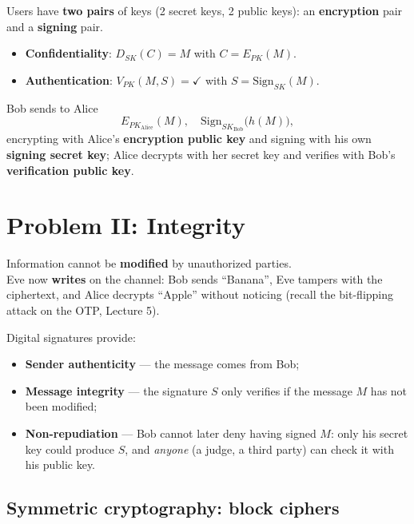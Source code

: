 \begin{defnbox}[title={All together: asymmetric confidentiality and authentication}]
Users have \textbf{two pairs} of keys (2 secret keys, 2 public keys): an
\textbf{encryption} pair and a \textbf{signing} pair.
\begin{itemize}
  \item \textbf{Confidentiality}: $D_{SK}(C) = M$ with $C = E_{PK}(M)$.
  \item \textbf{Authentication}: $V_{PK}(M, S) = \checkmark$ with
        $S = \mathrm{Sign}_{SK}(M)$.
\end{itemize}
Bob sends to Alice
\[
  E_{PK_{\text{Alice}}}(M), \quad \mathrm{Sign}_{SK_{\text{Bob}}}\big(h(M)\big),
\]
encrypting with Alice's \textbf{encryption public key} and signing with his own
\textbf{signing secret key}; Alice decrypts with her secret key and verifies with Bob's
\textbf{verification public key}.
\end{defnbox}

\section{Problem II: Integrity}

\begin{defnbox}[title=Integrity]
Information cannot be \textbf{modified} by unauthorized parties. \\
Eve now \textbf{writes} on the channel: Bob sends ``Banana'', Eve tampers with the
ciphertext, and Alice decrypts ``Apple'' without noticing (recall the bit-flipping attack
on the OTP, Lecture 5).
\end{defnbox}

\begin{propbox}[title=Message integrity through digital signatures]
Digital signatures provide:
\begin{itemize}
  \item \textbf{Sender authenticity} --- the message comes from Bob;
  \item \textbf{Message integrity} --- the signature $S$ only verifies if the message $M$
        has not been modified;
  \item \textbf{Non-repudiation} --- Bob cannot later deny having signed $M$: only his
        secret key could produce $S$, and \emph{anyone} (a judge, a third party) can
        check it with his public key.
\end{itemize}
\end{propbox}

\subsection{Symmetric cryptography: block ciphers}

